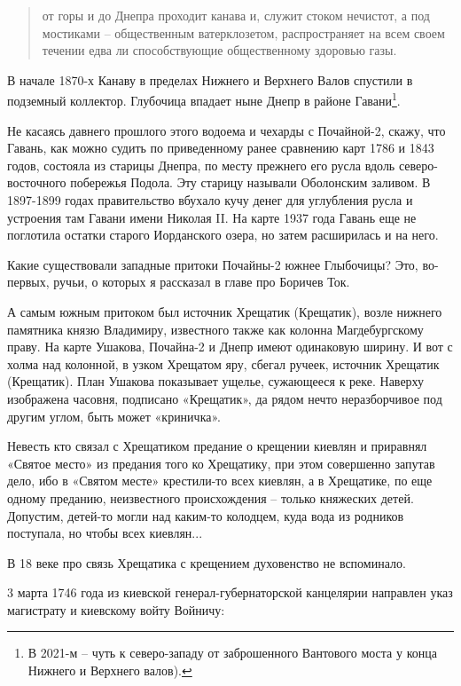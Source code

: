 \begin{quotation}
от горы и до Днепра проходит канава и, служит стоком нечистот, а под мостиками – общественным ватерклозетом, распространяет на всем своем течении едва ли способствующие общественному здоровью газы.
\end{quotation}

В начале 1870-х Канаву в пределах Нижнего и Верхнего Валов спустили в подземный коллектор. Глубочица впадает ныне Днепр в районе Гавани\footnote{В 2021-м – чуть к северо-западу от заброшенного Вантового моста у конца Нижнего и Верхнего валов).}.

Не касаясь давнего прошлого этого водоема и чехарды с Почайной-2, скажу, что Гавань, как можно судить по приведенному ранее сравнению карт 1786 и 1843 годов, состояла из старицы Днепра, по месту прежнего его русла вдоль северо-восточного побережья Подола. Эту старицу называли Оболонским заливом. В 1897-1899 годах правительство вбухало кучу денег для углубления русла и устроения там Гавани имени Николая II. На карте 1937 года Гавань еще не поглотила остатки старого Иорданского озера, но затем расширилась и на него.

Какие существовали западные притоки Почайны-2 южнее Глыбочицы? Это, во-первых, ручьи, о которых я рассказал в главе про Боричев Ток.

А самым южным притоком был источник Хрещатик (Крещатик), возле нижнего памятника князю Владимиру, известного также как колонна Магдебургскому праву. На карте Ушакова, Почайна-2 и Днепр имеют одинаковую ширину. И вот с холма над колонной, в узком Хрещатом яру, сбегал ручеек, источник Хрещатик (Крещатик). План Ушакова показывает ущелье, сужающееся к реке. Наверху изображена часовня, подписано «Крещатик», да рядом нечто неразборчивое под другим углом, быть может «криничка».

Невесть кто связал с Хрещатиком предание о крещении киевлян и приравнял «Святое место» из предания того ко Хрещатику, при этом совершенно запутав дело, ибо в «Святом месте» крестили-то всех киевлян, а в Хрещатике, по еще одному преданию, неизвестного происхождения – только княжеских детей. Допустим, детей-то могли над каким-то колодцем, куда вода из родников поступала, но чтобы всех киевлян...

В 18 веке про связь Хрещатика с крещением духовенство не вспоминало. 

3 марта 1746 года из киевской генерал-губернатор\-ской канцелярии направлен указ магистрату и киевскому войту Войничу:

